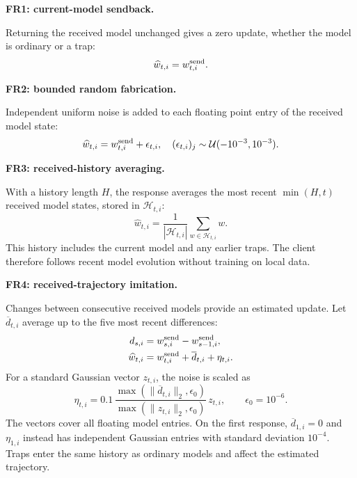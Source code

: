 \documentclass[conference]{IEEEtran}
\begin{document}
\par\medskip\noindent\textbf{FR1: current-model sendback.}\par\nopagebreak\smallskip\noindent
Returning the received model unchanged gives a zero update, whether the
model is ordinary or a trap:
\begin{equation}
 \widehat w_{t,i}=w^{\rm send}_{t,i}.
\end{equation}

\par\medskip\noindent\textbf{FR2: bounded random fabrication.}\par\nopagebreak\smallskip\noindent
Independent uniform noise is added to each floating point entry of the
received model state:
\begin{equation}
 \widehat w_{t,i}=w^{\rm send}_{t,i}+\epsilon_{t,i},\quad
 (\epsilon_{t,i})_j\sim\mathcal U(-10^{-3},10^{-3}).
\end{equation}

\par\medskip\noindent\textbf{FR3: received-history averaging.}\par\nopagebreak\smallskip\noindent
With a history length $H$, the response averages the most recent
$\min(H,t)$ received model states, stored in $\mathcal H_{t,i}$:
\begin{equation}
 \widehat w_{t,i}=\frac{1}{|\mathcal H_{t,i}|}
       \sum_{w\in\mathcal H_{t,i}}w.
\end{equation}
This history includes the current model and any earlier traps. The client
therefore follows recent model evolution without training on local data.

\par\medskip\noindent\textbf{FR4: received-trajectory imitation.}\par\nopagebreak\smallskip\noindent
Changes between consecutive received models provide an estimated update.
Let $\overline d_{t,i}$ average up to the five most recent differences:
\begin{align}
 d_{s,i}&=w^{\rm send}_{s,i}-w^{\rm send}_{s-1,i},\\
 \widehat w_{t,i}&=w^{\rm send}_{t,i}+\overline d_{t,i}+\eta_{t,i}.
\end{align}
For a standard Gaussian vector $z_{t,i}$, the noise is scaled as
\begin{equation}\label{eq:fr4-noise}
 \eta_{t,i}=0.1\,
 \frac{\max(\|\overline d_{t,i}\|_2,\epsilon_0)}
      {\max(\|z_{t,i}\|_2,\epsilon_0)}\,z_{t,i},
 \qquad\epsilon_0=10^{-6}.
\end{equation}
The vectors cover all floating model entries. On the first response,
$\overline d_{1,i}=0$ and $\eta_{1,i}$ instead has independent Gaussian entries with
standard deviation $10^{-4}$. Traps enter the same history as ordinary
models and affect the estimated trajectory.

\end{document}

